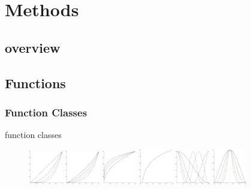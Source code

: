\documentclass{beamer}
\begin{document}
\section{Methods}
\subsection{overview}
\begin{frame}
    \tableofcontents
\end{frame}

\subsection{Functions}
\begin{frame}
\frametitle{Function Classes}
function classes
	\begin{figure}
		\centering
		\includegraphics[width=1.5cm]{fig/Template1n.eps}
		\includegraphics[width=1.5cm]{fig/Template2n.eps}
		\includegraphics[width=1.5cm]{fig/Template3n.eps}
\hspace
		\includegraphics[width=1.5cm]{fig/Template4n.eps}
		\includegraphics[width=1.5cm]{fig/Template5n.eps}
		\includegraphics[width=1.5cm]{fig/Template6n.eps}
	\end{figure}
\end{frame}
\end{document}
